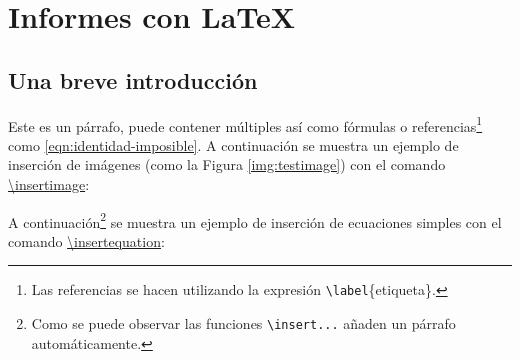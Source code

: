 \section{Informes con \LaTeX}

\subsection{Una breve introducción}
	
	Este es un párrafo, puede contener múltiples  así como fórmulas o referencias\footnote{Las referencias se hacen utilizando la expresión \texttt{\textbackslash label}\{etiqueta\}.} como \eqref{eqn:identidad-imposible}. A continuación se muestra un ejemplo de inserción de imágenes (como la Figura \ref{img:testimage}) con el comando \href{https://latex.ppizarror.com/informe.html#hlp-imagen}{\textbackslash insertimage}:


	A continuación\footnote{Como se puede observar las funciones \texttt{\textbackslash insert...} añaden un párrafo automáticamente.} se muestra un ejemplo de inserción de ecuaciones simples con el comando \href{https://latex.ppizarror.com/informe.html#hlp-formulae}{\textbackslash insertequation}:

